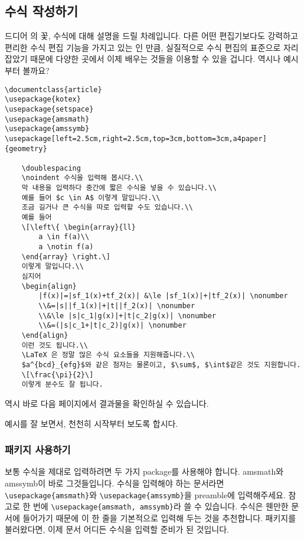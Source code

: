
\newpage
\subsection{수식 작성하기}
\label{subsec:ams}
드디어 \lt 의 꽃, 수식에 대해 설명을 드릴 차례입니다.
다른 어떤 편집기보다도 강력하고 편리한 수식 편집 기능을 가지고 있는 \lt 인 만큼, 실질적으로 수식 편집의 표준으로 자리 잡았기 때문에 다양한 곳에서 이제 배우는 것들을 이용할 수 있을 겁니다.
역시나 예시부터 볼까요?

\begin{Verbatim}[frame=single]
\documentclass{article}
\usepackage{kotex}
\usepackage{setspace}
\usepackage{amsmath}
\usepackage{amssymb}
\usepackage[left=2.5cm,right=2.5cm,top=3cm,bottom=3cm,a4paper]{geometry}

	\doublespacing
	\noindent 수식을 입력해 봅시다.\\
	막 내용을 입력하다 중간에 짧은 수식을 넣을 수 있습니다.\\
	예를 들어 $c \in A$ 이렇게 말입니다.\\
	조금 길거나 큰 수식을 따로 입력할 수도 있습니다.\\
	예를 들어
	\[\left\{ \begin{array}{ll}
		a \in f(a)\\
		a \notin f(a)
	\end{array} \right.\]
	이렇게 말입니다.\\
	심지어
	\begin{align}
		|f(x)|=|sf_1(x)+tf_2(x)| &\le |sf_1(x)|+|tf_2(x)| \nonumber
		\\&=|s||f_1(x)|+|t||f_2(x)| \nonumber
		\\&\le |s|c_1|g(x)|+|t|c_2|g(x)| \nonumber
		\\&=(|s|c_1+|t|c_2)|g(x)| \nonumber
	\end{align}
	이런 것도 됩니다.\\
	\LaTeX 은 정말 많은 수식 요소들을 지원해줍니다.\\
	$a^{bcd}_{efg}$와 같은 첨자는 물론이고, $\sum$, $\int$같은 것도 지원합니다.
	\[\frac{\pi}{2}\]
	이렇게 분수도 잘 됩니다.

\end{Verbatim}
역시 바로 다음 페이지에서 결과물을 확인하실 수 있습니다.



예시를 잘 보면서, 천천히 시작부터 보도록 합시다.

\subsubsection{패키지 사용하기}
\label{subsec:ams-package}
보통 수식을 제대로 입력하려면 두 가지 package를 사용해야 합니다.
amsmath와 amssymb이 바로 그것들입니다.
수식을 입력해야 하는 문서라면 \verb|\usepackage{amsmath}|와 \verb|\usepackage{amssymb}|을 preamble에 입력해주세요.
참고로 한 번에 \verb|\usepackage{amsmath, amssymb}|라 쓸 수 있습니다.
수식은 웬만한 문서에 들어가기 때문에 이 한 줄을 기본적으로 입력해 두는 것을 추천합니다.
패키지를 불러왔다면, 이제 문서 어디든 수식을 입력할 준비가 된 것입니다.


